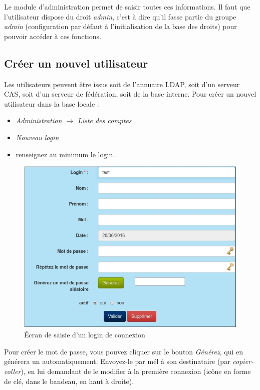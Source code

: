 Le module d'administration permet de saisir toutes ces informations. Il faut que l'utilisateur dispose du droit \textit{admin}, c'est à dire qu'il fasse partie du groupe \textit{admin} (configuration par défaut à l'initialisation de la base des droits) pour pouvoir accéder à ces fonctions.

\subsection{Créer un nouvel utilisateur}

Les utilisateurs peuvent être issus soit de l'annuaire LDAP, soit d'un serveur CAS, soit d'un serveur de fédération, soit de la base interne. 
Pour créer un nouvel utilisateur dans la base locale :
\begin{itemize}
\item \textit{Administration $\rightarrow$ Liste des comptes }
\item \textit{Nouveau login}
\item renseignez au minimum le login.
\end{itemize}

\begin{figure}[H]
\includegraphics[width=\linewidth]{images/user_create}
\caption{Écran de saisie d'un login de connexion}
\end{figure}

Pour créer le mot de passe, vous pouvez cliquer sur le bouton \textit{Générez}, qui  en générera un automatiquement. Envoyez-le par mél à son destinataire (par \textit{copier-coller}), en lui demandant de le modifier à la première connexion (icône en forme de clé, dans le bandeau, en haut à droite).

